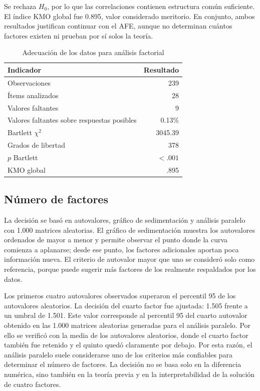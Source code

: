 \documentclass[12pt,letterpaper]{article}
\begin{document}
Se rechaza $H_0$, por lo que las correlaciones contienen estructura común suficiente. El índice KMO global fue 0.895, valor considerado meritorio. En conjunto, ambos resultados justifican continuar con el AFE, aunque no determinan cuántos factores existen ni prueban por sí solos la teoría.


\begin{table}[H]
\centering
\caption{Adecuación de los datos para análisis factorial}
\label{tab:p2-adecuacion}
\begin{tabular}{lr}
\toprule
Indicador & Resultado \\
\midrule
Observaciones & 239 \\
Ítems analizados & 28 \\
Valores faltantes & 9 \\
Valores faltantes sobre respuestas posibles & 0.13\% \\
Bartlett $\chi^2$ & 3045.39 \\
Grados de libertad & 378 \\
$p$ Bartlett & $<.001$ \\
KMO global & .895 \\
\bottomrule
\end{tabular}
\end{table}

\subsection{Número de factores}

La decisión se basó en autovalores, gráfico de sedimentación y análisis paralelo con 1.000 matrices aleatorias. El gráfico de sedimentación muestra los autovalores ordenados de mayor a menor y permite observar el punto donde la curva comienza a aplanarse; desde ese punto, los factores adicionales aportan poca información nueva. El criterio de autovalor mayor que uno se consideró solo como referencia, porque puede sugerir más factores de los realmente respaldados por los datos.

Los primeros cuatro autovalores observados superaron el percentil 95 de los autovalores aleatorios. La decisión del cuarto factor fue ajustada: 1.505 frente a un umbral de 1.501. Este valor corresponde al percentil 95 del cuarto autovalor obtenido en las 1.000 matrices aleatorias generadas para el análisis paralelo. Por ello se verificó con la media de los autovalores aleatorios, donde el cuarto factor también fue retenido y el quinto quedó claramente por debajo. Por esta razón, el análisis paralelo suele considerarse uno de los criterios más confiables para determinar el número de factores. La decisión no se basa solo en la diferencia numérica, sino también en la teoría previa y en la interpretabilidad de la solución de cuatro factores.
\end{document}
